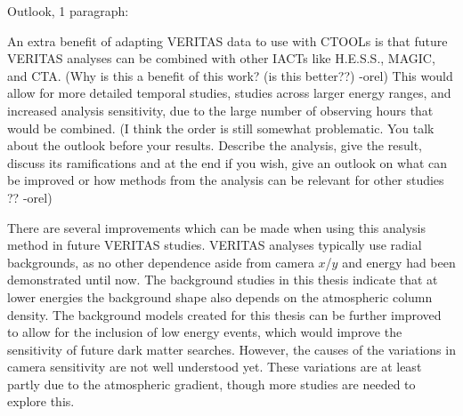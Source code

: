 Outlook, 1 paragraph:

An extra benefit of adapting VERITAS data to use with CTOOLs is that future VERITAS analyses can be combined with other IACTs like H.E.S.S., MAGIC, and CTA.
{\color{red}(Why is this a benefit of this work? (is this better??) -orel)}
This would allow for more detailed temporal studies, studies across larger energy ranges, and increased analysis sensitivity, due to the large number of observing hours that would be combined.
{\color{red}(I think the order is still somewhat problematic.
You talk about the outlook before your results.
Describe the analysis, give the result, discuss its ramifications and at the end if you wish, give an outlook on what can be improved or how methods from the analysis can be relevant for other studies ?? -orel)}

There are several improvements which can be made when using this analysis method in future VERITAS studies.
VERITAS analyses typically use radial backgrounds, as no other dependence aside from camera $x$/$y$ and energy had been demonstrated until now.
The background studies in this thesis indicate that at lower energies the background shape also depends on the atmospheric column density.
The background models created for this thesis can be further improved to allow for the inclusion of low energy events, which would improve the sensitivity of future dark matter searches.
However, the causes of the variations in camera sensitivity are not well understood yet.
These variations are at least partly due to the atmospheric gradient, though more studies are needed to explore this.


